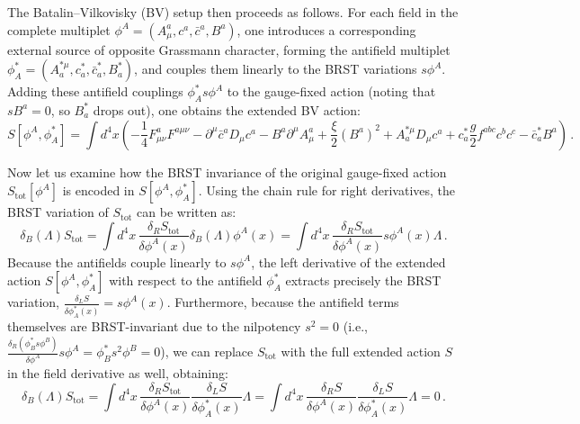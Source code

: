 The Batalin--Vilkovisky (BV) setup then proceeds as follows. For each field in the complete multiplet \(\phi^A = (A_\mu^a, c^a, \bar{c}^a, B^a)\), one introduces a corresponding external source of opposite Grassmann character, forming the antifield multiplet \(\phi_A^* = (A_a^{*\mu}, c_a^*, \bar{c}_a^*, B_a^*)\), and couples them linearly to the BRST variations \(s\phi^A\). Adding these antifield couplings \(\phi_A^* s\phi^A\) to the gauge-fixed action (noting that \(sB^a = 0\), so \(B_a^*\) drops out), one obtains the extended BV action:
\begin{equation} \label{eq:bv_ym_extended_action}
    S[\phi^A, \phi_A^*] = \int d^4x \left( -\frac{1}{4} F_{\mu\nu}^a F^{a\mu\nu} - \partial^\mu \bar{c}^a D_\mu c^a - B^a \partial^\mu A_\mu^a + \frac{\xi}{2} (B^a)^2 + A_a^{*\mu} D_\mu c^a + c_a^* \frac{g}{2} f^{abc} c^b c^c - \bar{c}_a^* B^a \right) \, .
\end{equation}

Now let us examine how the BRST invariance of the original gauge-fixed action \(S_{\text{tot}}[\phi^A]\) is encoded in \(S[\phi^A, \phi_A^*]\). Using the chain rule for right derivatives, the BRST variation of \(S_{\text{tot}}\) can be written as:
\[
    \delta_B(\Lambda) S_{\text{tot}} = \int d^4x \, \frac{\delta_R S_{\text{tot}}}{\delta \phi^A(x)} \delta_B(\Lambda)\phi^A(x) = \int d^4x \, \frac{\delta_R S_{\text{tot}}}{\delta \phi^A(x)} s\phi^A(x) \Lambda \, .
\]
Because the antifields couple linearly to \(s\phi^A\), the left derivative of the extended action \(S[\phi^A, \phi_A^*]\) with respect to the antifield \(\phi_A^*\) extracts precisely the BRST variation, \(\frac{\delta_L S}{\delta \phi_A^*(x)} = s\phi^A(x)\). Furthermore, because the antifield terms themselves are BRST-invariant due to the nilpotency \(s^2 = 0\) (i.e., \(\frac{\delta_R ( \phi_B^* s\phi^B )}{\delta \phi^A} s\phi^A = \phi_B^* s^2 \phi^B = 0\)), we can replace \(S_{\text{tot}}\) with the full extended action \(S\) in the field derivative as well, obtaining:
\begin{equation} \label{eq:bv_brst_invariance_chain}
    \delta_B(\Lambda) S_{\text{tot}} = \int d^4x \, \frac{\delta_R S_{\text{tot}}}{\delta \phi^A(x)} \frac{\delta_L S}{\delta \phi_A^*(x)} \Lambda = \int d^4x \, \frac{\delta_R S}{\delta \phi^A(x)} \frac{\delta_L S}{\delta \phi_A^*(x)} \Lambda = 0 \, .
\end{equation}

